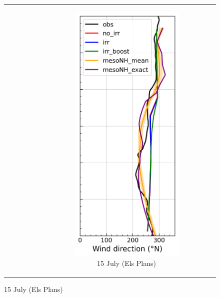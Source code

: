 \begin{figure}[hbtp]
{\begin{tabular}{@{}cccc@{}}
\begin{subfigure}[t]{0.283\textwidth}
        \end{subfigure} &
        \begin{subfigure}[t]{0.283\textwidth}
            \caption{15 July (Els Plans)}
            \includegraphics[width=\textwidth]{images/chap5/profiles/profile_elsplans_wind_direction_1507_.png}

\end{subfigure}
\end{tabular}}
\end{figure}
